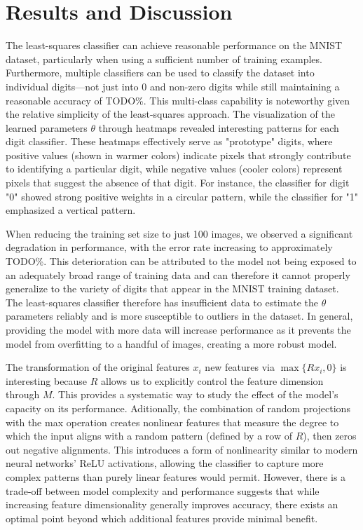 \documentclass[conference]{IEEEtran}
\begin{document}
\section{Results and Discussion}
The least-squares classifier can achieve reasonable performance on the MNIST dataset, particularly when using a sufficient number of training examples. Furthermore, multiple classifiers can be used to classify the dataset into individual digits---not just into 0 and non-zero digits while still maintaining a reasonable accuracy of TODO\%. This multi-class capability is noteworthy given the relative simplicity of the least-squares approach. The visualization of the learned parameters $\theta$ through heatmaps revealed interesting patterns for each digit classifier. These heatmaps effectively serve as "prototype" digits, where positive values (shown in warmer colors) indicate pixels that strongly contribute to identifying a particular digit, while negative values (cooler colors) represent pixels that suggest the absence of that digit. For instance, the classifier for digit "0" showed strong positive weights in a circular pattern, while the classifier for "1" emphasized a vertical pattern.

When reducing the training set size to just 100 images, we observed a significant degradation in performance, with the error rate increasing to approximately TODO\%. This deterioration can be attributed to the model not being exposed to an adequately broad range of training data and can therefore it cannot properly generalize to the variety of digits that appear in the MNIST training dataset. The least-squares classifier therefore has insufficient data to estimate the $\theta$ parameters reliably and is more susceptible to outliers in the dataset. In general, providing the model with more data will increase performance as it prevents the model from overfitting to a handful of images, creating a more robust model.

The transformation of the original features $x_i$ new features via $\max \{Rx_i, 0\}$ is interesting because $R$ allows us to explicitly control the feature dimension through $M$. This provides a systematic way to study the effect of the model's capacity on its performance. Aditionally, the combination of random projections with the max operation creates nonlinear features that measure the degree to which the input aligns with a random pattern (defined by a row of $R$), then zeros out negative alignments. This introduces a form of nonlinearity similar to modern neural networks' ReLU activations, allowing the classifier to capture more complex patterns than purely linear features would permit. However, there is a trade-off between model complexity and performance suggests that while increasing feature dimensionality generally improves accuracy, there exists an optimal point beyond which additional features provide minimal benefit.
\end{document}

